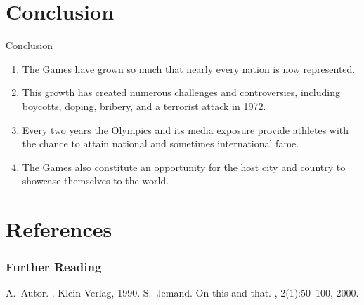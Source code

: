 \documentclass[xcolor=table]{beamer}
\begin{document}
\section{Conclusion}


\begin{frame}{Conclusion}
    \begin{enumerate}
        \item The Games have grown so much that nearly every nation is now represented. 
        \item This growth has created numerous challenges and controversies, including boycotts, doping, bribery, and a terrorist attack in 1972.
        \item  Every two years the Olympics and its media exposure provide athletes with the chance to attain national and sometimes international fame. 
        \item The Games also constitute an opportunity for the host city and country to showcase themselves to the world.
   \end{enumerate}
\end{frame}
\section{References}
\begin{frame}[allowframebreaks]
	\frametitle<presentation>{Further Reading}    
	\begin{thebibliography}{10}    
	\beamertemplatebookbibitems
	  A.~Autor.
	  .
	  \newblock Klein-Verlag, 1990.
	\beamertemplatearticlebibitems
	  S.~Jemand.
	  \newblock On this and that.
	  , 2(1):50--100, 2000.
	\end{thebibliography}
  \end{frame}
\end{document}
